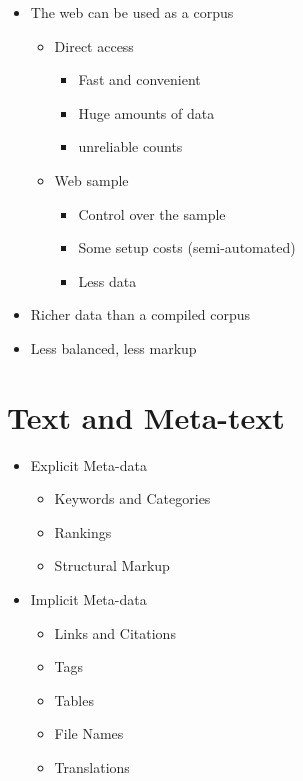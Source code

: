 \documentclass[a4paper,landscape,headrule,footrule,xetex]{foils}
\begin{document}
\begin{itemize}
\item The web can be used as a corpus
  \begin{itemize}
  \item Direct access
    \begin{itemize}
    \item Fast and convenient
    \item Huge amounts of data
    \item[\Bad] unreliable counts 
    \end{itemize}
  \item Web sample
    \begin{itemize}
    \item Control over the sample
    \item Some setup costs (semi-automated)
    \item[\Bad] Less data 
    \end{itemize}
  \end{itemize}
\item Richer data than a compiled corpus
\item[\Bad] Less balanced, less markup
\end{itemize}





\section{Text and Meta-text}
\begin{itemize}
\item Explicit Meta-data
  \begin{itemize}
  \item Keywords and Categories
  \item Rankings
  \item Structural Markup
  \end{itemize}
\item Implicit Meta-data
  \begin{itemize}
  \item Links and Citations
  \item Tags
  \item Tables
  \item File Names
  \item Translations
  \end{itemize}
\end{itemize}
\end{document}
